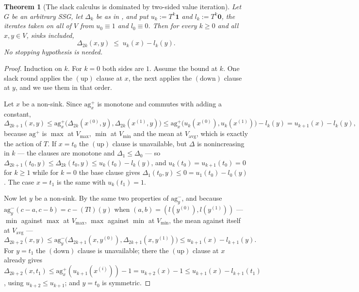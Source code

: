 \documentclass[11pt]{article}
\theoremstyle{plain}
\newtheorem{theorem}{Theorem}[section]
\theoremstyle{definition}
\newcommand{\Vmax}{V_{\max}}
\newcommand{\Vmin}{V_{\min}}
\newcommand{\Vavg}{V_{\mathrm{avg}}}
\begin{document}
\begin{theorem}[The slack calculus is dominated by two-sided value iteration]\label{thm:slack-vi-upper}
Let $G$ be an arbitrary SSG, let $\Delta_k$ be as in , and put
$u_k:=T^{k}\mathbf 1$ and $l_k:=T^{k}\mathbf 0$, the iterates taken on all of
$V$ from $u_0\equiv1$ and $l_0\equiv0$. Then for every $k\ge0$ and all
$x,y\in V$, sinks included,
\[
  \Delta_{2k}(x,y)\;\le\;u_k(x)-l_k(y).
\]
No stopping hypothesis is needed.
\end{theorem}

\begin{proof}
Induction on $k$. For $k=0$ both sides are $1$. Assume the bound at $k$. One
slack round applies the $(\mathrm{up})$ clause at $x$, the next applies the
$(\mathrm{down})$ clause at $y$, and we use them in that order.

Let $x$ be a non-sink. Since $\mathrm{ag}^{+}_{x}$ is monotone and commutes with
adding a constant,
\[
  \Delta_{2k+1}(x,y)\le
  \mathrm{ag}^{+}_{x}\bigl(\Delta_{2k}(x^{(0)},y),\Delta_{2k}(x^{(1)},y)\bigr)
  \le\mathrm{ag}^{+}_{x}\bigl(u_k(x^{(0)}),u_k(x^{(1)})\bigr)-l_k(y)
  =u_{k+1}(x)-l_k(y),
\]
because $\mathrm{ag}^{+}$ is $\max$ at $\Vmax$, $\min$ at $\Vmin$ and the mean
at $\Vavg$, which is exactly the action of $T$. If $x=t_0$ the
$(\mathrm{up})$ clause is unavailable, but $\Delta$ is nonincreasing in $k$ ---
the clauses are monotone and $\Delta_1\le\Delta_0$ --- so
$\Delta_{2k+1}(t_0,y)\le\Delta_{2k}(t_0,y)\le u_k(t_0)-l_k(y)$, and
$u_k(t_0)=u_{k+1}(t_0)=0$ for $k\ge1$ while for $k=0$ the base clause gives
$\Delta_1(t_0,y)\le0=u_1(t_0)-l_0(y)$. The case $x=t_1$ is the same with
$u_k(t_1)=1$.

Now let $y$ be a non-sink. By the same two properties of
$\mathrm{ag}^{-}_{y}$, and because $\mathrm{ag}^{-}_{y}(c-a,c-b)=c-(Tl)(y)$
when $(a,b)=(l(y^{(0)}),l(y^{(1)}))$ --- $\min$ against $\max$ at $\Vmax$,
$\max$ against $\min$ at $\Vmin$, the mean against itself at $\Vavg$ ---
\[
  \Delta_{2k+2}(x,y)\le
  \mathrm{ag}^{-}_{y}\bigl(\Delta_{2k+1}(x,y^{(0)}),\Delta_{2k+1}(x,y^{(1)})\bigr)
  \le u_{k+1}(x)-l_{k+1}(y).
\]
For $y=t_1$ the $(\mathrm{down})$ clause is unavailable; there the
$(\mathrm{up})$ clause at $x$ already gives
$\Delta_{2k+2}(x,t_1)\le\mathrm{ag}^{+}_{x}(u_{k+1}(x^{(i)}))-1=u_{k+2}(x)-1
\le u_{k+1}(x)-l_{k+1}(t_1)$, using $u_{k+2}\le u_{k+1}$; and $y=t_0$ is
symmetric.
\end{proof}
\end{document}
